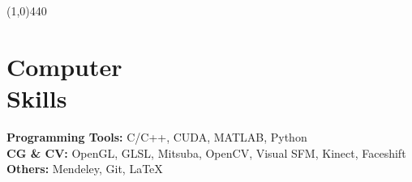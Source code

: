 \documentclass[margin,line]{resume}
\begin{document}
\begin{resume}
    \vspace{-5.0mm}
    \line(1,0){440}
    \vspace{-5.0mm}

    \section{\mysidestyle Computer \\Skills}

    \textbf{Programming Tools:} C/C++, CUDA, MATLAB, Python     \\
    \textbf{CG \& CV:} OpenGL, GLSL, Mitsuba, OpenCV, Visual SFM, Kinect, Faceshift      \\
    \textbf{Others:} Mendeley, Git, \LaTeX  \\                                 


\end{resume}
\end{document}
